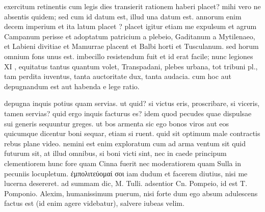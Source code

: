 exercitum retinentis cum legis dies transierit rationem haberi placet? mihi vero ne absentis quidem; sed cum id datum est, illud una datum est. annorum enim decem imperium et ita latum placet ? placet igitur etiam me expulsum et agrum Campanum perisse et adoptatum patricium a plebeio, Gaditanum a Mytilenaeo, et Labieni divitiae et Mamurrae placent et Balbi horti et Tusculanum. sed horum omnium fons unus est. imbecillo resistendum fuit et id erat facile; nunc legiones XI , equitatus tantus quantum volet, Transpadani, plebes urbana, tot tribuni pl., tam perdita iuventus, tanta auctoritate dux, tanta audacia. cum hoc aut depugnandum est aut habenda e lege ratio.

 depugna inquis potius quam servias. ut quid? si victus eris, proscribare, si viceris, tamen servias? quid ergo inquis facturus es? idem quod pecudes quae dispulsae sui generis sequuntur greges. ut bos armenta sic ego bonos viros aut eos quicumque dicentur boni sequar, etiam si ruent. quid sit optimum male contractis rebus plane video. nemini est enim exploratum cum ad arma ventum sit quid futurum sit, at illud omnibus, si boni victi sint, nec in caede principum clementiorem hunc fore quam Cinna fuerit nec moderatiorem quam Sulla in pecuniis locupletum. ἐμπολιτεύομαί σοι iam dudum et facerem diutius, nisi me lucerna desereret. ad summam dic, M. Tulli. adsentior Cn. Pompeio, id est T. Pomponio. Alexim, humanissimum puerum, nisi forte dum ego absum adulescens factus est (id enim agere videbatur), salvere iubeas velim.
